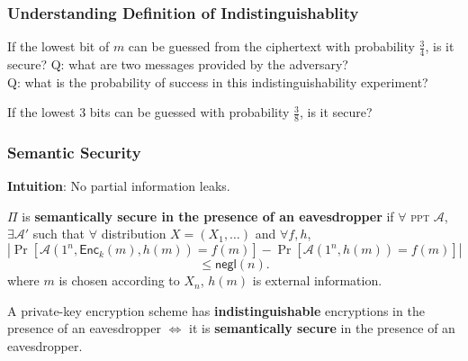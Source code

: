 \begin{frame}\frametitle{Understanding Definition of Indistinguishablity}
\begin{exampleblock}{If the lowest bit of $m$ can be guessed from the ciphertext with probability $\frac{3}{4}$, is it secure?}
Q: what are two messages provided by the adversary?\\
Q: what is the probability of success in this indistinguishability experiment?
\end{exampleblock}
\begin{exampleblock}{If the lowest 3 bits can be guessed with probability $\frac{3}{8}$, is it secure?}
\end{exampleblock}
\end{frame}
\begin{frame}\frametitle{Semantic Security}
\textbf{Intuition}: No partial information leaks.
\begin{definition}
$\Pi$ is \textbf{semantically secure in the presence of an eavesdropper} if $\forall$ \textsc{ppt} $\mathcal{A}$, $\exists \mathcal{A'}$ such that $\forall$ distribution $X = (X_1, \dots)$ and $\forall f, h$,
\[ \left|\Pr[\mathcal{A}(1^n,\mathsf{Enc}_k(m),h(m))=f(m)]-\Pr[\mathcal{A}(1^n,h(m))=f(m)]\right| 
\]
\[ \le \mathsf{negl}(n).
\]
where $m$ is chosen according to $X_n$, $h(m)$ is external information.
\end{definition}
\begin{theorem}
A private-key encryption scheme has \textbf{indistinguishable} encryptions in the presence of an eavesdropper $\iff$ it is \textbf{semantically secure} in the presence of an eavesdropper.
\end{theorem}
\end{frame}
